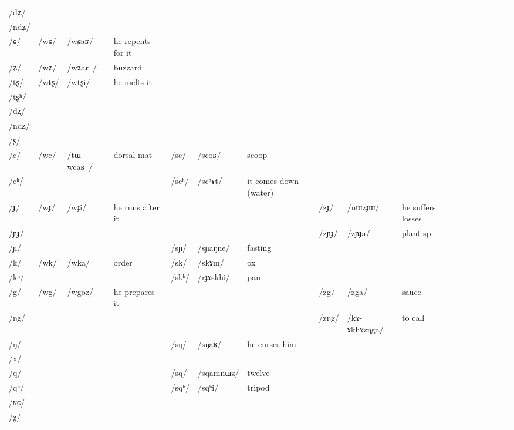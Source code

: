 \documentclass[oldfontcommands,oneside,a4paper,11pt]{article}
\newcommand{\ipa}[1]{\mbox{/#1/}} %
\newcommand{\deux}[1]{/#1/}
\newcommand{\tib}[1]{\cellcolor{lightgray}\textbf{#1}}
\begin{document}
\begin{landscape}
\begin{longtable}{l|lll|lll|lll|lllllll}
\ipa{dʑ}  &	  &	  &	&	  &	  &	&	  &	  &	&	\\
\ipa{ndʑ}  &	  &	  &	&	  &	  &	&	  &	  &	&	\\
\ipa{ɕ}  &	\deux{wɕ}  &	\ipa{wɕaʁ}  &he repents for it&	  &	  &	&	  &	  &	&	\\	
\ipa{ʑ}  &	\deux{wʑ}  &	\ipa{wʑar }  &	buzzard&	  &	  &	&	  &	  &	&	\\
\ipa{tʂ}  &	\deux{wtʂ}  &	\ipa{wtʂi}  & he melts it	&	  &	  &	&	  &	  &	&	\\
\ipa{tʂʰ}  &	  &	  &	&	  &	  &	&	  &	  &	&	\\
\ipa{dʐ}  &	  &	  &	&	  &	  &	&	  &	  &	&	\\
\ipa{ndʐ}  &	  &	  &	&	  &	  &	&	  &	  &	&	\\
\ipa{ʂ}  &	  &	  &	&	  &	  &	&	  &	  &	&	\\
\ipa{c}  &	\deux{wc}  &	\ipa{tɯ-wcaʁ }  &dorsal mat	&	\deux{sc}  &	\ipa{scoʁ}  &scoop	&	  &	  &	&	\\
\ipa{cʰ}  &	  &	  &	&	\deux{scʰ}  &	\ipa{scʰɤt}  &	it comes down (water)&	  &	  &	&	\\
\ipa{ɟ}  &	\deux{wɟ}  &	\ipa{wɟi}  &he runs after it	&	  &	  &	&	\deux{zɟ}  &	\ipa{nɯzɟɯ}  &	he suffers losses&	\\
\ipa{ɲɟ}  &	  &	  &	&	  &	  &	&	\deux{zɲɟ}  &	\ipa{zɲɟa}  &	plant sp.&	\\
\ipa{ɲ}  &	  &	  &	&	\deux{sɲ}  &	\ipa{sɲaŋne}  &fasting	&	   &	 &	&	\\
\ipa{k}  &	\deux{wk}  &	\ipa{wka}  &	order&	\deux{sk}  &	\ipa{skɤm}  &	ox&	  &	  &	&	\\
\ipa{kʰ}  &	  &	  &	&	\deux{skʰ}  &	\ipa{rɟɤskhi}  &pan	&	  &	  &	&	\\
\ipa{g}  &	\deux{wg}  \tib{}&	\ipa{wgoz}  &	he prepares it&	  &	  &	& 	\deux{zg}  &	\ipa{zga}  &	sauce&	\\
\ipa{ŋg}  &	  &	  &	&	  &	  &	&	\deux{zŋg}  &	\ipa{kɤ-ɤkhɤzŋga}  &	to call&	\\
\ipa{ŋ}  &	  &	  &	&	\deux{sŋ}  &	\ipa{sŋaʁ}  &	he curses him&	  &	  &	&	\\
\ipa{x}  &	  &	  &	&	  &	  &	&	  &	  &	&	\\
\ipa{q}  &	  &	  &	&	\deux{sq}  &	\ipa{sqamnɯz}  &	twelve&	  &	  &	&	\\
\ipa{qʰ}  &	  &	  &	&	\deux{sqʰ}  &	\ipa{sqʰi}  &	tripod&	  &	  &	&	\\
\ipa{ɴɢ}  &	  &	  &	&	  &	  &	&	  &	  &	&	\\
\ipa{χ}  &	  &	  &	&	  &	  &	&	  &	  &	&	\\

\end{longtable}
\end{landscape}
\end{document}

